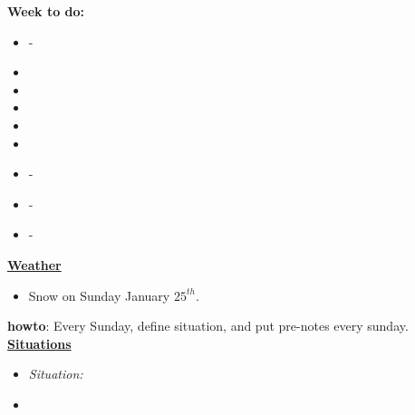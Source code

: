 \documentclass[11pt]{article}
\begin{document}
{            %
            \textbf{Week to do:} 
            \begin{itemize}
              \small \item \small - 
            \item \small
            \item \small
            \item \small
            \item \small
            \item \small
            \item \small - 
            \item \small - 
            \item \small - 
            \end{itemize} 
            \newpage 
            \textbf{\small \underline{Weather}} 
            \begin{itemize} 
            \item \tiny Snow on Sunday January $25^{th}$. 
            \end{itemize} 

            \textbf{howto}: Every Sunday, define situation, and put pre-notes every sunday. \\
            \textbf{\small \underline{Situations}} \\ 
            \begin{itemize}
            \item \tiny \textit{Situation:}
           \item \tiny 
            \end{itemize}
          
}
\end{document}
